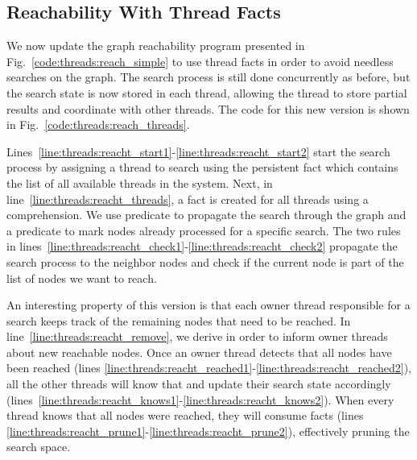 \subsection{Reachability With Thread Facts}

We now update the graph reachability program presented in
Fig.~\ref{code:threads:reach_simple} to use thread facts in order to avoid
needless searches on the graph. The search process is still done concurrently as
before, but the search state is now stored in each thread, allowing the thread
to store partial results and coordinate with other threads. The code for this new
version is shown in Fig.~\ref{code:threads:reach_threads}.

Lines~\ref{line:threads:reacht_start1}-\ref{line:threads:reacht_start2} start
the search process by assigning a thread  to search  using
the persistent fact  which contains the list of all
available threads in the system. Next, in
line~\ref{line:threads:reacht_threads}, a fact  is created
for all threads using a comprehension. We use predicate  to
propagate the search through the graph and a predicate  to mark
nodes already processed for a specific search.  The two rules in
lines~\ref{line:threads:reacht_check1}-\ref{line:threads:reacht_check2}
propagate the search process to the neighbor nodes and check if the current node
is part of the list of nodes we want to reach.

An interesting property of this version is that each owner thread responsible
for a search keeps track of the remaining nodes that need to be reached. In
line~\ref{line:threads:reacht_remove}, we derive  in
order to inform owner threads about new reachable nodes. Once an owner thread
detects that all nodes have been reached (lines
\ref{line:threads:reacht_reached1}-\ref{line:threads:reacht_reached2}), all the
other threads will know that and update their search state accordingly
(lines~\ref{line:threads:reacht_knows1}-\ref{line:threads:reacht_knows2}). When
every thread knows that all nodes were reached, they will consume
 facts (lines
\ref{line:threads:reacht_prune1}-\ref{line:threads:reacht_prune2}), effectively
pruning the search space.

